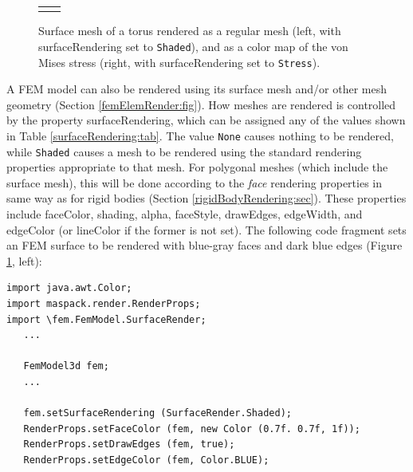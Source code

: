 \begin{figure}[h]
\begin{center}
\begin{tabular}{cc}
\fi
\end{tabular}
\end{center}
\caption{Surface mesh of a torus rendered as a regular
mesh (left, with {\sf surfaceRendering} set to {\tt Shaded}), and as a
color map of the von Mises stress (right, with {\sf surfaceRendering}
set to {\tt Stress}).}
\label{femSurfaceRender:fig} 
\end{figure}

A FEM model can also be rendered using its surface mesh and/or other
mesh geometry (Section \ref{femElemRender:fig}). How meshes are
rendered is controlled by the property {\sf surfaceRendering}, which
can be assigned any of the values shown in
Table \ref{surfaceRendering:tab}. The value {\tt None} causes nothing
to be rendered, while {\tt Shaded} causes a mesh to be rendered using
the standard rendering properties appropriate to that mesh. For
polygonal meshes (which include the surface mesh), this will be done
according to the {\it face} rendering properties in same way as for
rigid bodies (Section \ref{rigidBodyRendering:sec}). These properties
include {\sf faceColor}, {\sf shading}, {\sf alpha}, {\sf faceStyle},
{\sf drawEdges}, {\sf edgeWidth}, and {\sf edgeColor} (or {\sf
lineColor} if the former is not set). The following code
fragment sets an FEM surface to be rendered with blue-gray
faces and dark blue edges (Figure \ref{femSurfaceRender:fig}, left):
\pdfbreak
%
\begin{lstlisting}[]
import java.awt.Color;
import maspack.render.RenderProps;
import \fem.FemModel.SurfaceRender;
   ...

   FemModel3d fem;
   ...

   fem.setSurfaceRendering (SurfaceRender.Shaded);
   RenderProps.setFaceColor (fem, new Color (0.7f. 0.7f, 1f));
   RenderProps.setDrawEdges (fem, true);
   RenderProps.setEdgeColor (fem, Color.BLUE);
\end{lstlisting}
%
